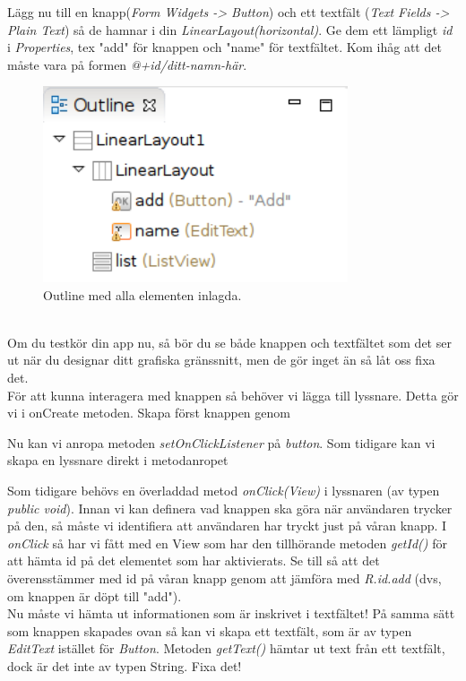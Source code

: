 \documentclass[11 pt, titlepage]{article} %
\begin{document}
Lägg nu till en knapp(\textit{Form Widgets -> Button}) och ett textfält (\textit{Text Fields -> Plain Text}) så de hamnar i din \textit{LinearLayout(horizontal)}. Ge dem ett lämpligt \textit{id} i \textit{Properties}, tex "add" för knappen och "name" för textfältet. Kom ihåg att det måste vara på formen \textit{@+id/ditt-namn-här}.\\

\begin{figure}[ht!]
\centering
\includegraphics[width=90mm]{images/outline.png}
\caption{Outline med alla elementen inlagda.}
\label{overflow}
\end{figure} \\

Om du testkör din app nu, så bör du se både knappen och textfältet som det ser ut när du designar ditt grafiska gränssnitt, men de gör inget än så låt oss fixa det. \\

För att kunna interagera med knappen så behöver vi lägga till lyssnare. Detta gör vi i onCreate metoden.
Skapa först knappen genom 

Nu kan vi anropa metoden \textit{setOnClickListener} på \textit{button}. Som tidigare kan vi skapa en lyssnare direkt i metodanropet


Som tidigare behövs en överladdad metod \textit{onClick(View)} i lyssnaren (av typen \textit{public void}). Innan vi kan definera vad knappen ska göra när användaren trycker på den, så måste vi identifiera att användaren har tryckt just på våran knapp.
I \textit{onClick} så har vi fått med en View som har den tillhörande metoden \textit{getId()} för att hämta id på det elementet som har aktivierats. Se till så att det överensstämmer med id på våran knapp genom att jämföra med \textit{R.id.add} (dvs, om knappen är döpt till "add").\\

Nu måste vi hämta ut informationen som är inskrivet i textfältet! På samma sätt som knappen skapades ovan så kan vi skapa ett textfält, som är av typen \textit{EditText} istället för \textit{Button}.
Metoden \textit{getText()} hämtar ut text från ett textfält, dock är det inte av typen String. Fixa det!\\
\end{document}

